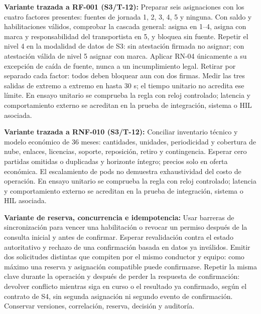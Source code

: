 \par\noindent\textbf{Variante trazada a RF-001 (S3/T-12):} Preparar seis asignaciones con los cuatro factores presentes: fuentes de jornada 1, 2, 3, 4, 5 y ninguna. Con saldo y habilitaciones válidos, comprobar la cascada general: asigna en 1–4, asigna con marca y responsabilidad del transportista en 5, y bloquea sin fuente. Repetir el nivel 4 en la modalidad de datos de S3: sin atestación firmada no asignar; con atestación válida de nivel 5 asignar con marca. Aplicar RN-04 únicamente a su excepción de caída de fuente, nunca a un incumplimiento legal. Retirar por separado cada factor: todos deben bloquear aun con dos firmas. Medir las tres salidas de extremo a extremo en hasta 30 s; el tiempo unitario no acredita ese límite. En ensayo unitario se comprueba la regla con reloj controlado; latencia y comportamiento externo se acreditan en la prueba de integración, sistema o HIL asociada.\par

\par\noindent\textbf{Variante trazada a RNF-010 (S3/T-12):} Conciliar inventario técnico y modelo económico de 36 meses: cantidades, unidades, periodicidad y cobertura de nube, enlaces, licencias, soporte, reposición, retiro y contingencia. Esperar cero partidas omitidas o duplicadas y horizonte íntegro; precios solo en oferta económica. El escalamiento de pods no demuestra exhaustividad del costo de operación. En ensayo unitario se comprueba la regla con reloj controlado; latencia y comportamiento externo se acreditan en la prueba de integración, sistema o HIL asociada.\par

\par\noindent\textbf{Variante de reserva, concurrencia e idempotencia:} Usar barreras de sincronización para vencer una habilitación o revocar un permiso después de la consulta inicial y antes de confirmar. Esperar revalidación contra el estado autoritativo y rechazo de una confirmación basada en datos ya inválidos. Emitir dos solicitudes distintas que compiten por el mismo conductor y equipo: como máximo una reserva y asignación compatible puede confirmarse. Repetir la misma clave durante la operación y después de perder la respuesta de confirmación: devolver conflicto mientras siga en curso o el resultado ya confirmado, según el contrato de S4, sin segunda asignación ni segundo evento de confirmación. Conservar versiones, correlación, reserva, decisión y auditoría.\par

